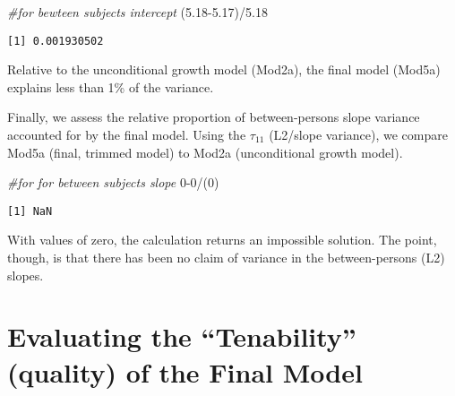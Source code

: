\documentclass[
  11pt,
]{book}
\newenvironment{Shaded}{\begin{snugshade}}{\end{snugshade}}
\newcommand{\CommentTok}[1]{\textcolor[rgb]{0.56,0.35,0.01}{\textit{#1}}}
\newcommand{\DecValTok}[1]{\textcolor[rgb]{0.00,0.00,0.81}{#1}}
\newcommand{\FloatTok}[1]{\textcolor[rgb]{0.00,0.00,0.81}{#1}}
\newcommand{\NormalTok}[1]{#1}
\newcommand{\SpecialCharTok}[1]{\textcolor[rgb]{0.00,0.00,0.00}{#1}}
\begin{document}
\begin{Shaded}
\begin{Highlighting}[]
\CommentTok{\#for bewteen subjects intercept}
\NormalTok{(}\FloatTok{5.18{-}5.17}\NormalTok{)}\SpecialCharTok{/}\FloatTok{5.18}
\end{Highlighting}
\end{Shaded}

\begin{verbatim}
[1] 0.001930502
\end{verbatim}

Relative to the unconditional growth model (Mod2a), the final model (Mod5a) explains less than 1\% of the variance.

Finally, we assess the relative proportion of between-persons slope variance accounted for by the final model. Using the \(\tau _{11}\) (L2/slope variance), we compare Mod5a (final, trimmed model) to Mod2a (unconditional growth model).

\begin{Shaded}
\begin{Highlighting}[]
\CommentTok{\#for for between subjects slope}
\DecValTok{0{-}0}\SpecialCharTok{/}\NormalTok{(}\DecValTok{0}\NormalTok{)}
\end{Highlighting}
\end{Shaded}

\begin{verbatim}
[1] NaN
\end{verbatim}

With values of zero, the calculation returns an impossible solution. The point, though, is that there has been no claim of variance in the between-persons (L2) slopes.

\hypertarget{evaluating-the-tenability-quality-of-the-final-model}{%
\section{Evaluating the ``Tenability'' (quality) of the Final Model}\label{evaluating-the-tenability-quality-of-the-final-model}}
\end{document}
